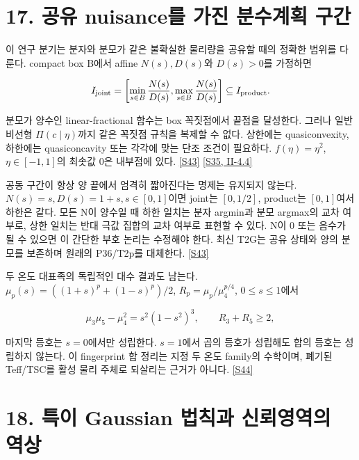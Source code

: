 \documentclass[11pt,a4paper]{article}
\begin{document}
\hypertarget{s17}{}

\section*{17. 공유 nuisance를 가진 분수계획 구간}


이 연구 분기는 분자와 분모가 같은 불확실한 물리량을 공유할 때의 정확한 범위를 다룬다. compact box B에서 affine \(N(s),D(s)\)와 \(D(s)>0\)를 가정하면


\[
I_{\rm joint}=\left[\min_{s\in B}\frac{N(s)}{D(s)},
\max_{s\in B}\frac{N(s)}{D(s)}\right]
\subseteq I_{\rm product}.
\]

분모가 양수인 linear-fractional 함수는 box 꼭짓점에서 끝점을 달성한다. 그러나 일반 비선형 \(\Pi(c\mid\eta)\)까지 같은 꼭짓점 규칙을 복제할 수 없다. 상한에는 quasiconvexity, 하한에는 quasiconcavity 또는 각각에 맞는 단조 조건이 필요하다. \(f(\eta)=\eta^2\), \(\eta\in[-1,1]\)의 최솟값 0은 내부점에 있다. \hyperlink{src:S43}{[S43]} \hyperlink{src:S35}{[S35, II-4.4]}


공동 구간이 항상 양 끝에서 엄격히 짧아진다는 명제는 유지되지 않는다. \(N(s)=s,D(s)=1+s,s\in[0,1]\)이면 joint는 \([0,1/2]\), product는 \([0,1]\)여서 하한은 같다. 모든 N이 양수일 때 하한 일치는 분자 argmin과 분모 argmax의 교차 여부로, 상한 일치는 반대 극값 집합의 교차 여부로 표현할 수 있다. N이 0 또는 음수가 될 수 있으면 이 간단한 부호 논리는 수정해야 한다. 최신 T2G는 공유 상태와 양의 분모를 보존하며 원래의 P36/T2p를 대체한다. \hyperlink{src:S43}{[S43]}


두 온도 대표족의 독립적인 대수 결과도 남는다. \(\mu_p(s)=((1+s)^p+(1-s)^p)/2\), \(R_p=\mu_p/\mu_4^{p/4}\), \(0\le s\le1\)에서


\[
\mu_3\mu_5-\mu_4^2=s^2(1-s^2)^3,
\qquad R_3+R_5\ge2,
\]

마지막 등호는 \(s=0\)에서만 성립한다. \(s=1\)에서 곱의 등호가 성립해도 합의 등호는 성립하지 않는다. 이 fingerprint 합 정리는 지정 두 온도 family의 수학이며, 폐기된 Teff/TSC를 활성 물리 주체로 되살리는 근거가 아니다. \hyperlink{src:S44}{[S44]}


\hypertarget{s18}{}

\section*{18. 특이 Gaussian 법칙과 신뢰영역의 역상}

\end{document}
